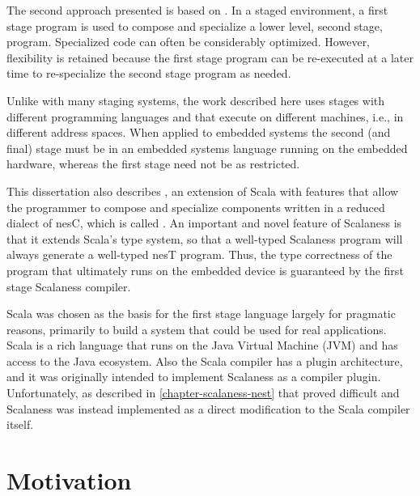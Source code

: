 The second approach presented is based on 
\cite{Taha-MetaML,Sheard-TemplateHaskell,Mainland-Flask-2008,FramedML}. In a staged environment,
a first stage program is used to compose and specialize a lower level, second stage, program.
Specialized code can often be considerably optimized. However, flexibility is retained because
the first stage program can be re-executed at a later time to re-specialize the second stage
program as needed.

Unlike with many staging systems, the work described here uses stages with different programming
languages and that execute on different machines, i.e., in different address spaces. When
applied to embedded systems the second (and final) stage must be in an embedded systems language
running on the embedded hardware, whereas the first stage need not be as restricted.

This dissertation also describes  \cite{chapin-GPCE-2013}, an extension of
Scala \cite{PiS2} with features that allow the programmer to compose and specialize components
written in a reduced dialect of nesC, which is called . An important and novel
feature of Scalaness is that it extends Scala's type system, so that a well-typed Scalaness
program will always generate a well-typed nesT program. Thus, the type correctness of the
program that ultimately runs on the embedded device is guaranteed by the first stage Scalaness
compiler.

Scala was chosen as the basis for the first stage language largely for pragmatic reasons,
primarily to build a system that could be used for real applications. Scala is a rich language
that runs on the Java Virtual Machine (JVM) and has access to the Java ecosystem. Also the Scala
compiler has a plugin architecture, and it was originally intended to implement Scalaness as a
compiler plugin. Unfortunately, as described in \autoref{chapter-scalaness-nest} that proved
difficult and Scalaness was instead implemented as a direct modification to the Scala compiler
itself.

\section{Motivation}


